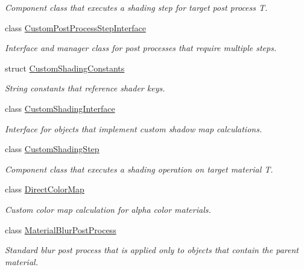 \begin{DoxyCompactItemize}
\begin{DoxyCompactList}\small\item\em Component class that executes a shading step for target post process T. \end{DoxyCompactList}\item 
class \mbox{\hyperlink{class_geometry_engine_1_1_custom_shading_1_1_custom_post_process_step_interface}{Custom\+Post\+Process\+Step\+Interface}}
\begin{DoxyCompactList}\small\item\em Interface and manager class for post processes that require multiple steps. \end{DoxyCompactList}\item 
struct \mbox{\hyperlink{struct_geometry_engine_1_1_custom_shading_1_1_custom_shading_constants}{Custom\+Shading\+Constants}}
\begin{DoxyCompactList}\small\item\em String constants that reference shader keys. \end{DoxyCompactList}\item 
class \mbox{\hyperlink{class_geometry_engine_1_1_custom_shading_1_1_custom_shading_interface}{Custom\+Shading\+Interface}}
\begin{DoxyCompactList}\small\item\em Interface for objects that implement custom shadow map calculations. \end{DoxyCompactList}\item 
class \mbox{\hyperlink{class_geometry_engine_1_1_custom_shading_1_1_custom_shading_step}{Custom\+Shading\+Step}}
\begin{DoxyCompactList}\small\item\em Component class that executes a shading operation on target material T. \end{DoxyCompactList}\item 
class \mbox{\hyperlink{class_geometry_engine_1_1_custom_shading_1_1_direct_color_map}{Direct\+Color\+Map}}
\begin{DoxyCompactList}\small\item\em Custom color map calculation for alpha color materials. \end{DoxyCompactList}\item 
class \mbox{\hyperlink{class_geometry_engine_1_1_custom_shading_1_1_material_blur_post_process}{Material\+Blur\+Post\+Process}}
\begin{DoxyCompactList}\small\item\em Standard blur post process that is applied only to objects that contain the parent material. \end{DoxyCompactList}\item 

\end{DoxyCompactItemize}
